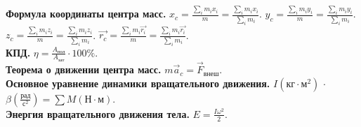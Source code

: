 \documentclass{article}
\begin{document}
	\textbf{Формула координаты центра масс.} $x_c = \frac{\sum\limits_i m_i x_i}{m} = \frac{\sum\limits_i m_i x_i}{\sum\limits_i m_i}$. $y_c = \frac{\sum\limits_i m_i y_i}{m} = \frac{\sum\limits_i m_i y_i}{\sum\limits_i m_i}$. $z_c = \frac{\sum\limits_i m_i z_i}{m} = \frac{\sum\limits_i m_i z_i}{\sum\limits_i m_i}$. $\vec{r_c} = \frac{\sum\limits_i m_i \vec{r_i}}{m} = \frac{\sum\limits_i m_i \vec{r_i}}{\sum\limits_i m_i}$. \\
	\textbf{КПД.} $\eta = \frac{A_{\text{пол}}}{A_{\text{зат}}} \cdot 100\%$. \\
	\textbf{Теорема о движении центра масс.} $m \vec{a}_c = \vec{F}_{\text{внеш}}$. \\
	\textbf{Основное уравнение динамики вращательного движения.} $I (\text{кг} \cdot \text{м}^2)$ $\cdot$ $\beta (\frac{\text{рад}}{\text{с}^2}) = \sum M (\text{Н} \cdot \text{м})$. \\
	\textbf{Энергия вращательного движения тела.}
	$E = \frac{I\omega^2}{2}$.
\end{document}
